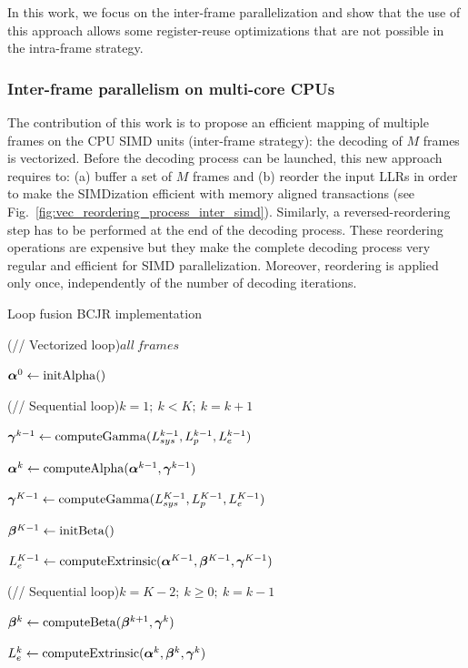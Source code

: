 In this work, we focus on the inter-frame parallelization and show that the use
of this approach allows some register-reuse optimizations that are not possible
in the intra-frame strategy.

\subsubsection{Inter-frame parallelism on multi-core CPUs}

The contribution of this work is to propose an efficient mapping of multiple
frames on the CPU SIMD units (inter-frame strategy): the decoding of $M$ frames
is vectorized. Before the decoding process can be launched, this new approach
requires to: (a) buffer a set of $M$ frames and (b) reorder the input LLRs in
order to make the SIMDization efficient with memory aligned transactions (see
Fig.~\ref{fig:vec_reordering_process_inter_simd}). Similarly, a
reversed-reordering step has to be performed at the end of the decoding process.
These reordering operations are expensive but they make the complete decoding
process very regular and efficient for SIMD parallelization. Moreover,
reordering is applied only once, independently of the number of decoding
iterations.

\begin{algorithm}
  \caption{Loop fusion BCJR implementation}
  \label{alg:turbo_bcjr_loop_fusion}

  \For(// Vectorized loop){$all~frames$}
  {
    $\boldsymbol{\alpha}^0\gets \operatorname*{initAlpha}()$

    \For(// Sequential loop){$k=1;~k<K;~k=k+1$}
    {
      $\boldsymbol{\gamma}^{k-1}\gets \operatorname*{computeGamma}(L_{sys}^{k-1}, L_{p}^{k-1}, L_{e}^{k-1})$

      $\boldsymbol{\alpha}^k\gets \operatorname*{computeAlpha}(\boldsymbol{\alpha}^{k-1}, \boldsymbol{\gamma}^{k-1})$
    }

    $\boldsymbol{\gamma}^{K-1}\gets \operatorname*{computeGamma}(L_{sys}^{K-1}, L_{p}^{K-1}, L_{e}^{K-1})$

    $\boldsymbol{\beta}^{K-1}\gets \operatorname*{initBeta}()$

    $L_e^{K-1}\gets \operatorname*{computeExtrinsic}(\boldsymbol{\alpha}^{K-1}, \boldsymbol{\beta}^{K-1}, \boldsymbol{\gamma}^{K-1})$

    \For(// Sequential loop){$k=K-2;~k \geq 0;~k=k-1$}
    {
      $\boldsymbol{\beta}^k\gets \operatorname*{computeBeta}(\boldsymbol{\beta}^{k+1}, \boldsymbol{\gamma}^{k})$

      $L_e^{k}\gets \operatorname*{computeExtrinsic}(\boldsymbol{\alpha}^{k}, \boldsymbol{\beta}^k, \boldsymbol{\gamma}^{k})$
    }
  }
\end{algorithm}

